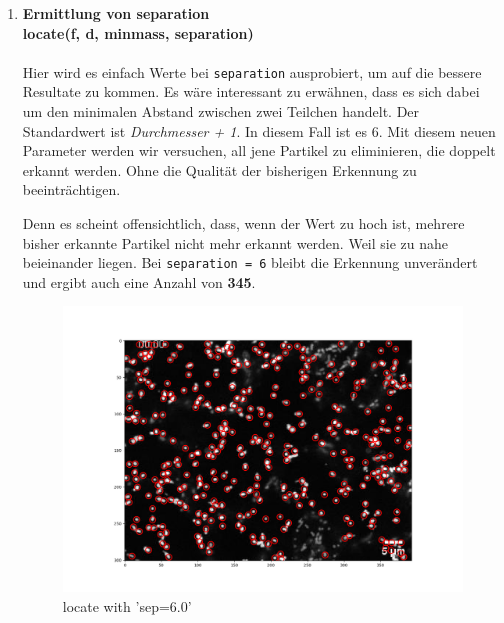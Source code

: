 \begin{enumerate}
		\item {\large \textbf{Ermittlung von \textbf{separation}}} \\
		\textbf{locate(f, d, minmass, separation)} \\ \\
    			Hier wird es einfach Werte bei \texttt{separation} ausprobiert, um auf die bessere Resultate zu kommen. 
    			Es wäre interessant zu erwähnen, dass es sich dabei um den minimalen Abstand zwischen zwei Teilchen handelt. Der Standardwert ist \textit{Durchmesser + 1}. In diesem Fall ist es 6. 
Mit diesem neuen Parameter werden wir versuchen, all jene Partikel zu eliminieren, die doppelt erkannt werden. Ohne die Qualität der bisherigen Erkennung zu beeinträchtigen.  

Denn es scheint offensichtlich, dass, wenn der Wert zu hoch ist, mehrere bisher erkannte Partikel nicht mehr erkannt werden. Weil sie zu nahe beieinander liegen.
Bei \texttt{separation = 6} bleibt die Erkennung unverändert und ergibt auch eine Anzahl von \textbf{345}.

\begin{figure}[H]
    \centering
    \includegraphics[scale=0.35]{Grafiken/trackpyBilder/locate_with_separation_(6).png}
    \caption{locate with 'sep=6.0'}
\end{figure}


\end{enumerate}
